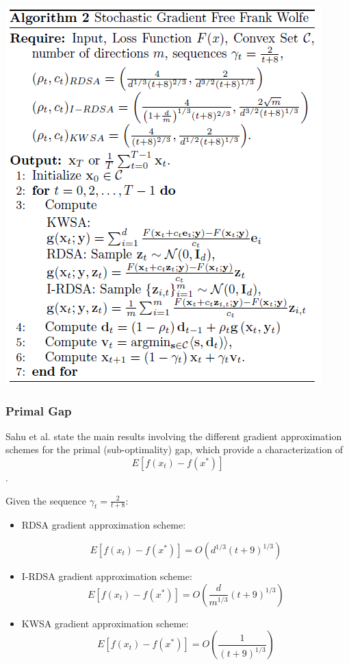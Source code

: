 \documentclass[10pt,twocolumn,letterpaper]{article}
\begin{document}
\begin{center}
   \includegraphics*[scale=0.75]{img/sgffw_pseudocode.png}
\end{center}

\subsubsection{Primal Gap}

Sahu et al. state the main results involving the different gradient 
approximation schemes for the primal (sub-optimality) gap, which provide a characterization of
\[E\left[f\left(x_{t}\right)-f\left(x^{*}\right)\right]\].

Given the sequence $\gamma_{t}= \frac{2}{t+8}$:

\begin{itemize}
   \item{RDSA gradient approximation scheme:

         \[
         E\left[f\left(x_{t}\right)-f\left(x^{*}\right)\right]=O\left(d^{1 / 3}(t+9)^{1 / 3}\right)
         \]
   }

   \item{I-RDSA gradient approximation scheme:
         \[
         E\left[f\left(x_{t}\right)-f\left(x^{*}\right)\right]=O\left(\frac{d}{m^{1 / 3}}(t+9)^{1 / 3}\right)
         \]
   }

   \item{KWSA gradient approximation scheme:
         \[
         E\left[f\left(x_{t}\right)-f\left(x^{*}\right)\right]=O\left(\frac{1}{(t+9)^{1 / 3}}\right)
         \]
   }
\end{itemize}
\end{document}
